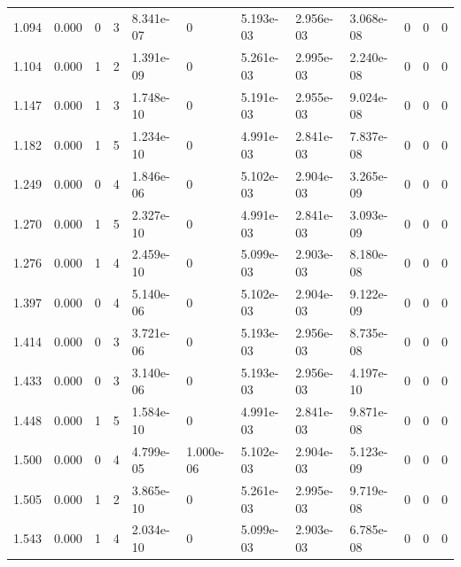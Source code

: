 \documentclass[preview]{standalone}
\begin{document}
{{\begin{tabular}{L{1.2cm}C{1.2cm} C{0.3cm}C{0.5cm} C{1.4cm}C{1.4cm} C{1.4cm}C{1.4cm} C{1.6cm}C{1.6cm} C{1.6cm}C{1.6cm}}
  1.094  &  0.000  & 0     &  3 &  8.341e-07  & 0  &  5.193e-03&   2.956e-03& 3.068e-08 & 0   &  0 & 0  \\ 
  1.104  &  0.000  & 1     &  2 &  1.391e-09  & 0  &  5.261e-03&   2.995e-03& 2.240e-08 & 0   &  0 & 0  \\ 
  1.147  &  0.000  & 1     &  3 &  1.748e-10  & 0  &  5.191e-03&   2.955e-03& 9.024e-08 & 0   &  0 & 0  \\ 
  1.182  &  0.000  & 1     &  5 &  1.234e-10  & 0  &  4.991e-03&   2.841e-03& 7.837e-08 & 0   &  0 & 0  \\ 
  1.249  &  0.000  & 0     &  4 &  1.846e-06  & 0  &  5.102e-03&   2.904e-03& 3.265e-09 & 0   &  0 & 0  \\ 
  1.270  &  0.000  & 1     &  5 &  2.327e-10  & 0  &  4.991e-03&   2.841e-03& 3.093e-09 & 0   &  0 & 0  \\ 
  1.276  &  0.000  & 1     &  4 &  2.459e-10  & 0  &  5.099e-03&   2.903e-03& 8.180e-08 & 0   &  0 & 0  \\ 
  1.397  &  0.000  & 0     &  4 &  5.140e-06  & 0  &  5.102e-03&   2.904e-03& 9.122e-09 & 0   &  0 & 0  \\ 
  1.414  &  0.000  & 0     &  3 &  3.721e-06  & 0  &  5.193e-03&   2.956e-03& 8.735e-08 & 0   &  0 & 0  \\ 
  1.433  &  0.000  & 0     &  3 &  3.140e-06  & 0  &  5.193e-03&   2.956e-03& 4.197e-10 & 0   &  0 & 0  \\ 
  1.448  &  0.000  & 1     &  5 &  1.584e-10  & 0  &  4.991e-03&   2.841e-03& 9.871e-08 & 0   &  0 & 0  \\ 
  1.500  &  0.000  & 0     &  4 &  4.799e-05  & 1.000e-06  &  5.102e-03&   2.904e-03& 5.123e-09 & 0   &  0 & 0  \\ 
  1.505  &  0.000  & 1     &  2 &  3.865e-10  & 0  &  5.261e-03&   2.995e-03& 9.719e-08 & 0   &  0 & 0  \\ 
  1.543  &  0.000  & 1     &  4 &  2.034e-10  & 0  &  5.099e-03&   2.903e-03& 6.785e-08 & 0   &  0 & 0  \\ 
\hline 
\end{tabular} 

}}
\end{document}
